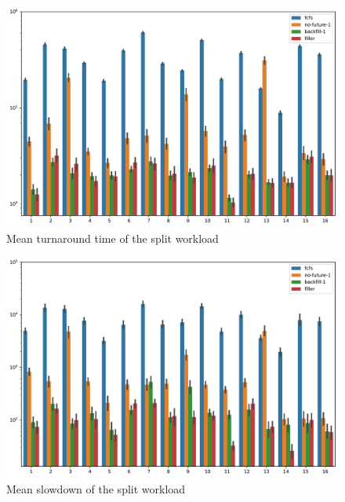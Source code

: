 \documentclass[thesis-en.tex]{subfiles}
\begin{document}
\begin{figure}[p]
    \centering
    \includegraphics[width=\textwidth]{reservation_io-aware_parts_turnaround-time.pdf}
    \caption{Mean turnaround time of the split workload}
    \label{fig:reservation_io-aware_parts_turnaround-time}
\end{figure}

\begin{figure}[p]
    \centering
    \includegraphics[width=\textwidth]{reservation_io-aware_parts_slowdown.pdf}
    \caption{Mean slowdown of the split workload}
    \label{fig:reservation_io-aware_parts_slowdown}
\end{figure}
\end{document}
